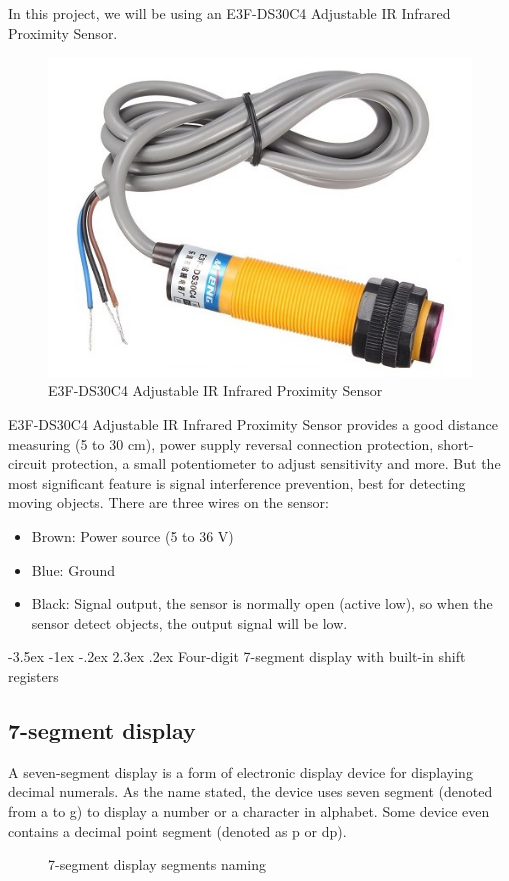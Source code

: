 \documentclass[13pt,a4paper,twoside]{report}
\makeatletter
\renewcommand\section{\@startsection {section}{1}{-1em}%
  {-3.5ex \@plus -1ex \@minus -.2ex}%
  {2.3ex \@plus.2ex}%
  {\normalfont\Large\bfseries}}
\makeatother
\begin{document}

In this project, we will be using an E3F-DS30C4 Adjustable IR Infrared Proximity Sensor.

\begin{figure}[H]
\centering
\includegraphics[scale=0.4]{images/prox_sensor.jpg}
\caption{E3F-DS30C4 Adjustable IR Infrared Proximity Sensor}
\end{figure}

E3F-DS30C4 Adjustable IR Infrared Proximity Sensor provides a good distance measuring (5 to 30 cm), power supply reversal connection protection, short-circuit protection, a small potentiometer to adjust sensitivity and more. But the most significant feature is signal interference prevention, best for detecting moving objects. There are three wires on the sensor:
\begin{itemize}
\item Brown: Power source (5 to 36 V)
\item Blue: Ground
\item Black: Signal output, the sensor is normally open (active low), so when the sensor detect objects, the output signal will be low.
\end{itemize}

\section{Four-digit 7-segment display with built-in shift registers}
\subsection{7-segment display}
A seven-segment display is a form of electronic display device for displaying decimal numerals. As the name stated, the device uses seven segment (denoted from a to g) to display a number or a character in alphabet. Some device even contains a decimal point segment (denoted as p or dp). \cite{wiki:7seg}
\begin{figure}[H]
\centering
\def\svgwidth{.17\textwidth}

\caption{7-segment display segments naming}
\end{figure}
\end{document}
